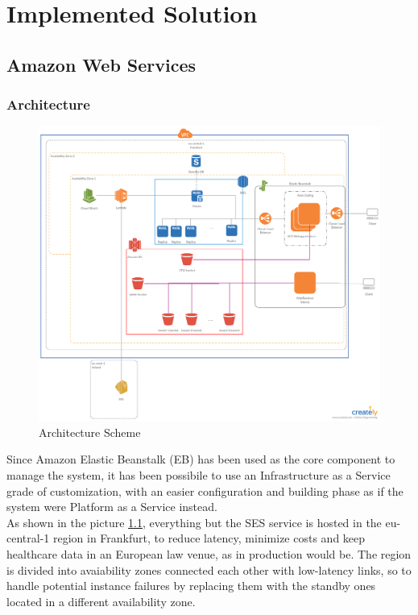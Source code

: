 \chapter{Implemented Solution}
\section{Amazon Web Services}

\subsection{Architecture}
\begin{figure}[h]
    \includegraphics[width=\textwidth]{architecture}
    \caption{Architecture Scheme}
    \label{fig:architecture}
\end{figure}
Since Amazon Elastic Beanstalk (EB) has been used as the core component to manage the system, it has been possibile to use an Infrastructure as a Service grade of customization, with an easier configuration and building phase as if the system were Platform as a Service instead.\\
As shown in the picture \ref{fig:architecture}, everything but the SES service is hosted in the eu-central-1 region in Frankfurt, to reduce latency, minimize costs and keep healthcare data in an European law venue, as in production would be.
The region is divided into avaiability zones connected each other with low-latency links, so to handle potential instance failures by replacing them with the standby ones located in a different availability zone.\\
